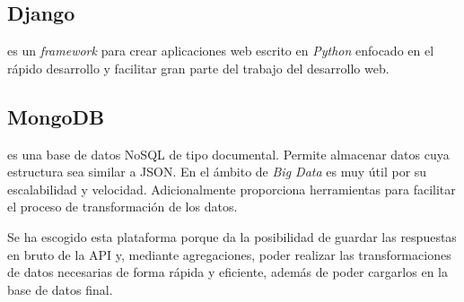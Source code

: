 \subsection{Django}
 es un \textit{framework} para crear aplicaciones web escrito en \textit{Python} enfocado en el rápido desarrollo y facilitar gran parte del trabajo del desarrollo web.

\subsection{MongoDB}
 es una base de datos NoSQL de tipo documental. Permite almacenar datos cuya estructura sea similar a JSON. En el ámbito de \textit{Big Data} es muy útil por su escalabilidad y velocidad. Adicionalmente proporciona herramientas para facilitar el proceso de transformación de los datos.

Se ha escogido esta plataforma porque da la posibilidad de guardar las respuestas en bruto de la API y, mediante agregaciones, poder realizar las transformaciones de datos necesarias de forma rápida y eficiente, además de poder cargarlos en la base de datos final.